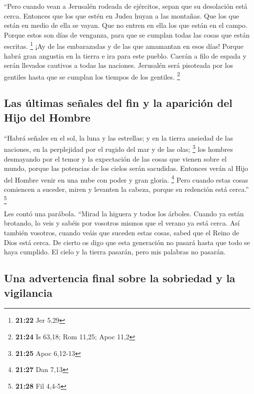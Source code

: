  ``Pero cuando vean a Jerusalén rodeada de ejércitos,
sepan que su desolación está cerca.  Entonces que los que
estén en Judea huyan a las montañas. Que los que están en medio de ella
se vayan. Que no entren en ella los que están en el campo.
 Porque estos son días de venganza, para que se cumplan
todas las cosas que están escritas. \footnote{\textbf{21:22} Jer 5,29}
 ¡Ay de las embarazadas y de las que amamantan en esos
días! Porque habrá gran angustia en la tierra e ira para este pueblo.
 Caerán a filo de espada y serán llevados cautivos a
todas las naciones. Jerusalén será pisoteada por los gentiles hasta que
se cumplan los tiempos de los gentiles. \footnote{\textbf{21:24} Is
  63,18; Rom 11,25; Apoc 11,2}

\hypertarget{las-uxfaltimas-seuxf1ales-del-fin-y-la-apariciuxf3n-del-hijo-del-hombre}{%
\subsection{Las últimas señales del fin y la aparición del Hijo del
Hombre}\label{las-uxfaltimas-seuxf1ales-del-fin-y-la-apariciuxf3n-del-hijo-del-hombre}}

 ``Habrá señales en el sol, la luna y las estrellas; y en
la tierra ansiedad de las naciones, en la perplejidad por el rugido del
mar y de las olas; \footnote{\textbf{21:25} Apoc 6,12-13}
 los hombres desmayando por el temor y la expectación de
las cosas que vienen sobre el mundo, porque las potencias de los cielos
serán sacudidas.  Entonces verán al Hijo del Hombre venir
en una nube con poder y gran gloria. \footnote{\textbf{21:27} Dan 7,13}
 Pero cuando estas cosas comiencen a suceder, miren y
levanten la cabeza, porque su redención está cerca.'' \footnote{\textbf{21:28}
  Fil 4,4-5}

 Les contó una parábola. ``Mirad la higuera y todos los
árboles.  Cuando ya están brotando, lo veis y sabéis por
vosotros mismos que el verano ya está cerca.  Así también
vosotros, cuando veáis que suceden estas cosas, sabed que el Reino de
Dios está cerca.  De cierto os digo que esta generación
no pasará hasta que todo se haya cumplido.  El cielo y la
tierra pasarán, pero mis palabras no pasarán.

\hypertarget{una-advertencia-final-sobre-la-sobriedad-y-la-vigilancia}{%
\subsection{Una advertencia final sobre la sobriedad y la
vigilancia}\label{una-advertencia-final-sobre-la-sobriedad-y-la-vigilancia}}

